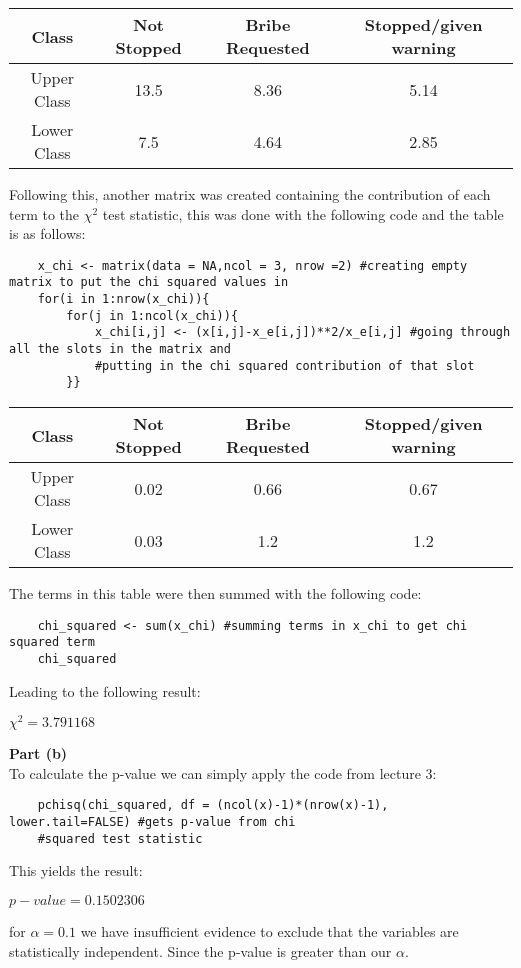 \documentclass{article}
\begin{document}
\begin{table}[h]
	\centering
\begin{tabular}{c |c c c }

	Class & Not Stopped & Bribe Requested & Stopped/given warning \\
	\hline 
	Upper Class & 13.5 & 8.36 & 5.14 \\
	Lower Class & 7.5 & 4.64 & 2.85 \\
	\hline

\end{tabular}
\end{table}
Following this, another matrix was created containing the contribution of each term to the $\chi^2$ test statistic, this was done with the following code and the table is as follows:
\begin{verbatim}
	x_chi <- matrix(data = NA,ncol = 3, nrow =2) #creating empty matrix to put the chi squared values in
	for(i in 1:nrow(x_chi)){
	    for(j in 1:ncol(x_chi)){
	        x_chi[i,j] <- (x[i,j]-x_e[i,j])**2/x_e[i,j] #going through all the slots in the matrix and 
	        #putting in the chi squared contribution of that slot
	    }}
\end{verbatim}
\begin{table}[h]
	\centering
	\begin{tabular}{c |c c c }
		
		Class & Not Stopped & Bribe Requested & Stopped/given warning \\
		\hline 
		Upper Class & 0.02 & 0.66 & 0.67 \\
		Lower Class & 0.03 & 1.2 & 1.2 \\
		\hline

	\end{tabular}
\end{table}
The terms in this table were then summed with the following code:
\begin{verbatim}
	chi_squared <- sum(x_chi) #summing terms in x_chi to get chi squared term
	chi_squared
\end{verbatim}
Leading to the following result:
\begin{center}
	\textbf{$\chi^2 = 3.791168$}\\
\end{center}
\pagebreak
\textbf{\large Part (b)\\}
To calculate the p-value we can simply apply the code from lecture 3:
\begin{verbatim}
	pchisq(chi_squared, df = (ncol(x)-1)*(nrow(x)-1),  lower.tail=FALSE) #gets p-value from chi 
	#squared test statistic
\end{verbatim}
This yields the result:
\begin{center}
	\textbf{$p-value = 0.1502306$}
\end{center}
for $\alpha = 0.1$ we have insufficient evidence to exclude that the variables are statistically independent. Since the p-value is greater than our $\alpha$.\\
\pagebreak
\end{document}
